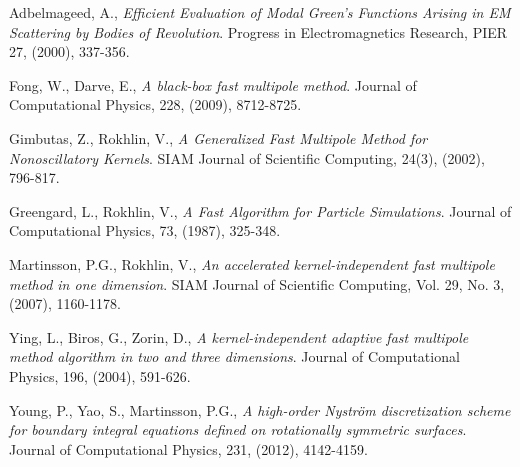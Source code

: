 \documentclass[11pt, oneside]{article}   	%
\begin{document}
\begin{thebibliography}{99}

 Adbelmageed, A., \emph{Efficient Evaluation of Modal Green's Functions Arising in EM Scattering by Bodies of Revolution}. Progress in Electromagnetics Research, PIER 27, (2000), 337-356.


 Fong, W., Darve, E., \emph{A black-box fast multipole method}. Journal of Computational Physics, 228, (2009), 8712-8725.

 Gimbutas, Z., Rokhlin, V., \emph{A Generalized Fast Multipole Method for Nonoscillatory Kernels}. SIAM Journal of Scientific Computing, 24(3), (2002), 796-817.

 Greengard, L., Rokhlin, V., \emph{A Fast Algorithm for Particle Simulations}. Journal of Computational Physics, 73, (1987), 325-348.


 Martinsson, P.G., Rokhlin, V., \emph{An accelerated kernel-independent fast multipole method in one dimension}. SIAM Journal of Scientific Computing, Vol. 29, No. 3, (2007), 1160-1178.


 Ying, L., Biros, G., Zorin, D., \emph{A kernel-independent adaptive fast multipole method algorithm in two and three dimensions}. Journal of Computational Physics, 196, (2004), 591-626.

 Young, P., Yao, S., Martinsson, P.G., \emph{A high-order Nystr{\"o}m discretization scheme for boundary integral equations defined on rotationally symmetric surfaces}. Journal of Computational Physics, 231, (2012), 4142-4159.


\end{thebibliography}
\end{document}
